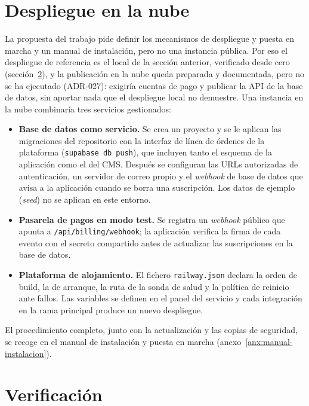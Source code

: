 \section{Despliegue en la nube}
\label{sec:despliegue-nube}

La propuesta del trabajo pide definir los mecanismos de despliegue y puesta en
marcha y un manual de instalación, pero no una instancia pública. Por eso el
despliegue de referencia es el local de la sección anterior, verificado desde
cero (sección~\ref{sec:despliegue-verificacion}), y la publicación en la nube
queda preparada y documentada, pero no se ha ejecutado (ADR-027): exigiría
cuentas de pago y publicar la API de la base de datos, sin aportar nada que el
despliegue local no demuestre. Una instancia en la nube combinaría tres
servicios gestionados:

\begin{itemize}
  \item \textbf{Base de datos como servicio.} Se crea un proyecto y se le
    aplican las migraciones del repositorio con la interfaz de línea de
    órdenes de la plataforma (\texttt{supabase db push}), que incluyen tanto
    el esquema de la aplicación como el del CMS. Después se configuran las
    URLs autorizadas de autenticación, un servidor de correo propio y el
    \emph{webhook} de base de datos que avisa a la aplicación cuando se borra
    una suscripción. Los datos de ejemplo (\emph{seed}) no se aplican en este
    entorno.
  \item \textbf{Pasarela de pagos en modo test.} Se registra un
    \emph{webhook} público que apunta a \texttt{/api/billing/webhook}; la
    aplicación verifica la firma de cada evento con el secreto compartido
    antes de actualizar las suscripciones en la base de datos.
  \item \textbf{Plataforma de alojamiento.} El fichero \texttt{railway.json}
    declara la orden de build, la de arranque, la ruta de la sonda de salud y
    la política de reinicio ante fallos. Las variables se definen en el panel
    del servicio y cada integración en la rama principal produce un nuevo
    despliegue.
\end{itemize}

El procedimiento completo, junto con la actualización y las copias de
seguridad, se recoge en el manual de instalación y puesta en marcha
(anexo~\ref{anx:manual-instalacion}).

\section{Verificación}
\label{sec:despliegue-verificacion}

